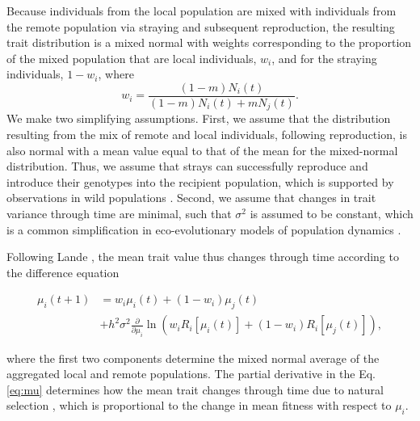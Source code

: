 \documentclass{revtex4}
\begin{document}
\noindent Because individuals from the local population are mixed with individuals from the remote population via straying and subsequent reproduction, the resulting trait distribution is a mixed normal with weights corresponding to the proportion of the mixed population that are local individuals, $w_i$, and for the straying individuals, $1-w_i$, where 
\begin{equation}
w_i=\frac{(1-m)N_i(t)}{(1-m) N_i(t) + m N_j(t)}.
\end{equation}
We make two simplifying assumptions.
First, we assume that the distribution resulting from the mix of remote and local individuals, following reproduction, is also normal with a mean value equal to that of the mean for the mixed-normal distribution.
Thus, we assume that strays can successfully reproduce and introduce their genotypes into the recipient population, which is supported by observations in wild populations \citep{Jasper:2013cc}.
Second, we assume that changes in trait variance through time are minimal, such that $\sigma^2$ is assumed to be constant, which is a common simplification in eco-evolutionary models of population dynamics \citep{Lande:1976ga,Schreiber:2011wx,Gilbert:2014ee,Gibert:2015kc}.



Following Lande \citep{Lande:1976ga}, the mean trait value thus changes through time according to the difference equation

\begin{align}
  \label{eq:mu}
  \mu_i(t+1) &= w_i\mu_i(t) + (1-w_i)\mu_j(t) \\ \nonumber
  &+ h^2\sigma^2\frac{\partial}{\partial \mu_i}\ln\left(w_i R_i[\mu_i(t)] + (1-w_i)R_i[\mu_j(t)]  \right),
\end{align}

\noindent where the first two components determine the mixed normal average of the aggregated local and remote populations.
The partial derivative in the Eq. \ref{eq:mu} determines how the mean trait changes through time due to natural selection \citep{Lande:1976ga}, which is proportional to the change in mean fitness with respect to $\mu_i$.
\\
\end{document}

